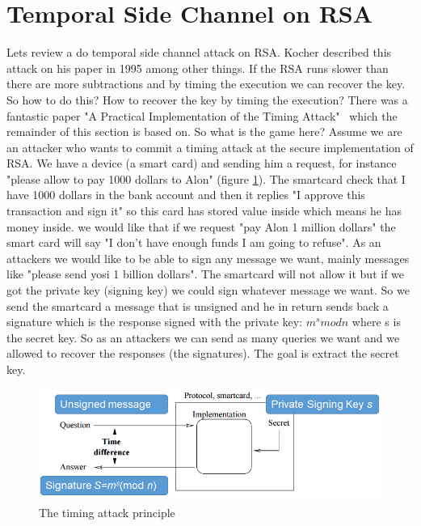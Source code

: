 \section{Temporal Side Channel on RSA}\label{c1_basicformatting:sec}

Lets review a do temporal side channel attack on RSA. Kocher described this attack on his paper in 1995 among other things. If the RSA runs slower than there are more subtractions and by timing the execution we can recover the key. So how to do this? How to recover the key by timing the execution? There was a fantastic paper "A Practical Implementation of the Timing Attack"~\cite{dhem1998practical} which the remainder of this section is based on. So what is the game here? Assume we are an attacker who wants to commit a timing attack at the secure implementation of RSA. We have a device (a smart card) and sending him a request, for instance "please allow to pay 1000 dollars to Alon" (figure \ref{smartcard:fig}). The smartcard check that I have 1000 dollars in the bank account and then it replies "I approve this transaction and sign it" so this card has stored value inside which means he has money inside. we would like that if we request "pay Alon 1 million dollars" the smart card will say "I don’t have enough funds I am going to refuse". As an attackers we would like to be able to sign any message we want, mainly messages like "please send yosi 1 billion dollars". The smartcard will not allow it but if we got the private key (signing key) we could sign whatever message we want. So we send the smartcard a message that is unsigned and he in return sends back a signature which is the response signed with the private key: \(m^s mod n\) where s is the secret key. So as an attackers we can send as many queries we want and we  allowed to recover the responses (the signatures). The goal is extract the secret key. 

\begin{figure}[H]
    \centering
    \includegraphics[scale=0.4]{images/smartcard.png}
    \caption{The timing attack principle} \label{smartcard:fig}
\end{figure}

